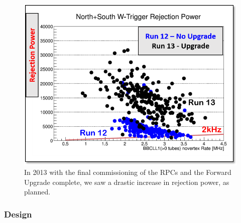 \begin{figure}
  \centering
  \includegraphics[width=0.8\linewidth]{./figures/rejection_power.png}
  \caption{
    In 2013 with the final commissioning of the RPCs and the Forward Upgrade
    complete, we saw a drastic increase in rejection power, as planned.
  }
  \label{fig:rpc_rejection_power}

\end{figure}


\subsubsection{Design}


